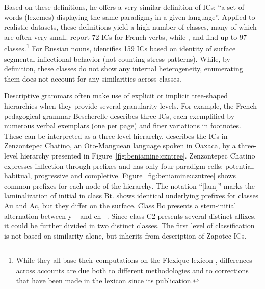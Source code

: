 \documentclass[output=paper]{langscibook}
\begin{document}
    Based on these definitions, he offers a very similar definition of ICs: ``a set of words (lexemes) displaying the same paradigm$_{2}$ in a given language''. Applied to realistic datasets, these definitions yield a high number of classes, many of which are often very small. \citet{StumpFinkel2013} report 72 ICs for French verbs, while \citet{Bonamihdr}, \citet{BeniamineBonamiSagot2017} and \citet{BeniaminePhd} find up to 97 classes.\footnote{While they all base their computations on the Flexique lexicon \citep{BonamiCaronPlancq2014}, differences across accounts are due both to different methodologies and to corrections that have been made in the lexicon since its publication.} For Russian nouns, \citet{BeniaminePhd} identifies 159 ICs based on identity of surface segmental inflectional behavior (not counting stress patterns). While, by definition, these classes do not show any internal heterogeneity, enumerating them does not account for any similarities across classes.

    Descriptive grammars often make use of explicit or implicit tree-shaped hierarchies when they provide several granularity levels. For example, the French pedagogical grammar Bescherelle \citep{bescherelle} describes three ICs, each exemplified by numerous verbal exemplars (one per page) and finer variations in footnotes. These can be interpreted as a three-level hierarchy. \citet{Campbell2011} describes the ICs in Zenzontepec Chatino, an Oto-Manguean language spoken in Oaxaca, by a three-level hierarchy presented in Figure~\ref{fig:beniamine:czntree}. Zenzontepec Chatino expresses inflection through prefixes and has only four paradigm cells: potential, habitual, progressive and completive. Figure~\ref{fig:beniamine:czntree} shows common prefixes for each node of the hierarchy. The notation ``[lam]'' marks the laminalization of initial \unitup{[t]} in class Bt. \citet{Campbell2011} shows identical underlying prefixes for classes Au and Ac, but they differ on the surface. Class Bc presents a stem-initial alternation between \unit{y-} and \unit{ch-}. Since class C2 presents several distinct affixes, it could be further divided in two distinct classes. The first level of  classification is not based on similarity alone, but inherits from  description of Zapotec ICs.
\end{document}
